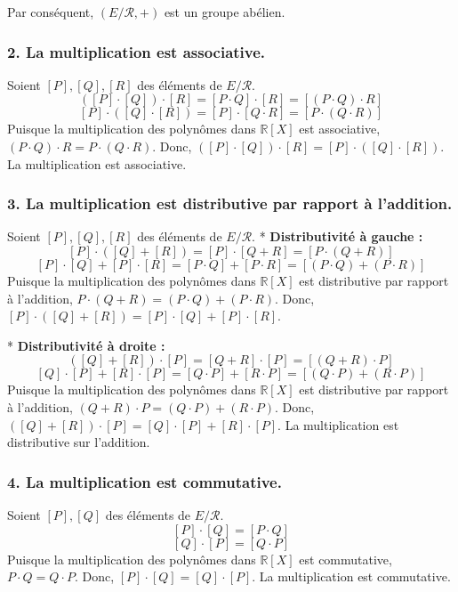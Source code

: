 \documentclass{report}
\begin{document}
Par conséquent, $(E/\mathcal{R}, +)$ est un groupe abélien.

\subsubsection*{2. La multiplication est associative.}
Soient $[P], [Q], [R]$ des éléments de $E/\mathcal{R}$.
$$([P] \cdot [Q]) \cdot [R] = [P \cdot Q] \cdot [R] = [(P \cdot Q) \cdot R]$$
$$[P] \cdot ([Q] \cdot [R]) = [P] \cdot [Q \cdot R] = [P \cdot (Q \cdot R)]$$
Puisque la multiplication des polynômes dans $\mathbb{R}[X]$ est associative, $(P \cdot Q) \cdot R = P \cdot (Q \cdot R)$.
Donc, $([P] \cdot [Q]) \cdot [R] = [P] \cdot ([Q] \cdot [R])$. La multiplication est associative.

\subsubsection*{3. La multiplication est distributive par rapport à l'addition.}
Soient $[P], [Q], [R]$ des éléments de $E/\mathcal{R}$.
*   \textbf{Distributivité à gauche :}
    $$[P] \cdot ([Q] + [R]) = [P] \cdot [Q+R] = [P \cdot (Q+R)]$$
    $$[P] \cdot [Q] + [P] \cdot [R] = [P \cdot Q] + [P \cdot R] = [(P \cdot Q) + (P \cdot R)]$$
    Puisque la multiplication des polynômes dans $\mathbb{R}[X]$ est distributive par rapport à l'addition, $P \cdot (Q+R) = (P \cdot Q) + (P \cdot R)$.
    Donc, $[P] \cdot ([Q] + [R]) = [P] \cdot [Q] + [P] \cdot [R]$.

*   \textbf{Distributivité à droite :}
    $$([Q] + [R]) \cdot [P] = [Q+R] \cdot [P] = [(Q+R) \cdot P]$$
    $$[Q] \cdot [P] + [R] \cdot [P] = [Q \cdot P] + [R \cdot P] = [(Q \cdot P) + (R \cdot P)]$$
    Puisque la multiplication des polynômes dans $\mathbb{R}[X]$ est distributive par rapport à l'addition, $(Q+R) \cdot P = (Q \cdot P) + (R \cdot P)$.
    Donc, $([Q] + [R]) \cdot [P] = [Q] \cdot [P] + [R] \cdot [P]$.
La multiplication est distributive sur l'addition.

\subsubsection*{4. La multiplication est commutative.}
Soient $[P], [Q]$ des éléments de $E/\mathcal{R}$.
$$[P] \cdot [Q] = [P \cdot Q]$$
$$[Q] \cdot [P] = [Q \cdot P]$$
Puisque la multiplication des polynômes dans $\mathbb{R}[X]$ est commutative, $P \cdot Q = Q \cdot P$.
Donc, $[P] \cdot [Q] = [Q] \cdot [P]$. La multiplication est commutative.
\end{document}
